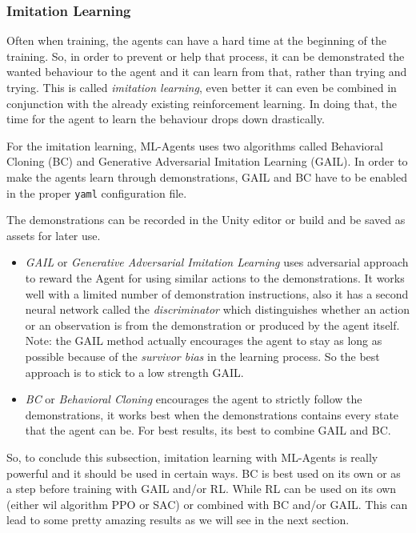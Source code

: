 \documentclass[a4paper, 12pt]{book}
\begin{document}
\subsubsection{Imitation Learning}

Often when training, the agents can have a hard time at the beginning of the training. So, in order to prevent or help that process, it can be demonstrated the wanted behaviour to the agent and it can learn from that, rather than trying and trying. This is called \emph{imitation learning}, even better it can even be combined in conjunction with the already existing reinforcement learning. In doing that, the time for the agent to learn the behaviour drops down drastically.

For the imitation learning, ML-Agents uses two algorithms called Behavioral Cloning (BC) and Generative Adversarial Imitation Learning (GAIL). In order to make the agents learn through demonstrations, GAIL and BC have to be enabled in the proper \texttt{yaml} configuration file.

The demonstrations can be recorded in the Unity editor or build and be saved as assets for later use.

\begin{itemize}
    \item \emph{GAIL} or \emph{Generative Adversarial Imitation Learning} \cite{GAIL} uses adversarial approach to reward the Agent for using similar actions to the demonstrations. It works well with a limited number of demonstration instructions, also it has a second neural network called the \emph{discriminator} which distinguishes whether an action or an observation is from the demonstration or produced by the agent itself. Note: the GAIL method actually encourages the agent to stay as long as possible because of the \emph{survivor bias} \cite{SurvivorBias} in the learning process. So the best approach is to stick to a low strength GAIL.
    \item \emph{BC} or \emph{Behavioral Cloning} encourages the agent to strictly follow the demonstrations, it works best when the demonstrations contains every state that the agent can be. For best results, its best to combine GAIL and BC.
\end{itemize}

So, to conclude this subsection, imitation learning with ML-Agents is really powerful and it should be used in certain ways. BC is best used on its own or as a step before training with GAIL and/or RL. While RL can be used on its own (either wil algorithm PPO or SAC) or combined with BC and/or GAIL. This can lead to some pretty amazing results as we will see in the next section.
\end{document}
